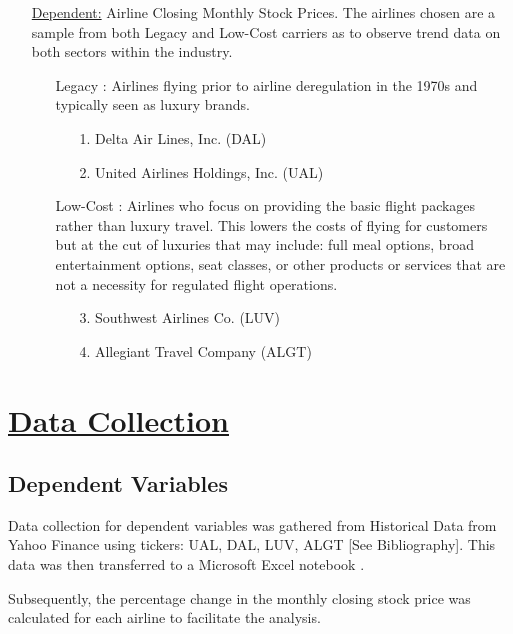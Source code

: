 \documentclass[12pt]{report}
\begin{document}
\begin{enumerate}
    \item[\underline{Dependent:}] Airline Closing Monthly Stock Prices.
    The airlines chosen are a sample from both Legacy and Low-Cost carriers as to observe trend data on both sectors within the industry.
    \begin{enumerate}
        \item[Legacy]: Airlines flying prior to airline deregulation in the 1970s and typically seen as luxury brands.
            \begin{enumerate}
                \item[1.]Delta Air Lines, Inc. (DAL)
                \item[2.]United Airlines Holdings, Inc. (UAL)
            \end{enumerate}
        \item[Low-Cost]: Airlines who focus on providing the basic flight packages rather than luxury travel. This lowers the costs of flying for customers but at the cut of luxuries that may include: full meal options, broad entertainment options, seat classes, or other products or services that are not a necessity for regulated flight operations.
            \begin{enumerate}
                \item[3.]Southwest Airlines Co. (LUV)
                \item[4.]Allegiant Travel Company (ALGT)
            \end{enumerate}
    \end{enumerate}


\end{enumerate}

\section*{\underline{Data Collection}}


\subsection*{Dependent Variables}
Data collection for dependent variables was gathered from Historical Data from Yahoo Finance using tickers: UAL, DAL, LUV, ALGT [See Bibliography]. This data was then transferred to a Microsoft Excel notebook .


Subsequently, the percentage change
in the monthly closing stock price was calculated for each airline to
facilitate the analysis.
\end{document}
